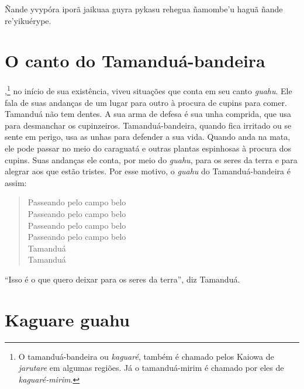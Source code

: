 Ñande yvypóra iporã jaikuaa guyra pykasu rehegua ñamombe'u haguã ñande
re'yikuérype.

\chapter{O canto do Tamanduá-bandeira}
,\footnote{O tamanduá-bandeira ou \textit{kaguaré}, também é chamado pelos Kaiowa de \textit{jarutare} em algumas regiões. Já o tamanduá-mirim é
  chamado por eles de \textit{kaguaré-mirim}.} no início de sua existência, viveu situações que conta em seu canto \textit{guahu}. Ele fala de suas andanças de um lugar para outro à procura de cupins para comer. Tamanduá não tem dentes. A sua arma de defesa é sua unha comprida, que usa para
desmanchar os cupinzeiros. Tamanduá-bandeira, quando fica irritado ou se
sente em perigo, usa as unhas para defender a sua vida. Quando anda na
mata, ele pode passar no meio do caraguatá e outras plantas espinhosas à
procura dos cupins. Suas andanças ele conta, por meio do \textit{guahu},
para os seres da terra e para alegrar aos que estão tristes. Por esse
motivo, o \textit{guahu} do Tamanduá-bandeira é assim:

\begin{verse}
Passeando\footnotemark{} pelo campo belo\\
Passeando pelo campo belo\\
Passeando pelo campo belo\\
Passeando pelo campo belo\\
Tamanduá\\
Tamanduá
\end{verse}

``Isso é o que quero deixar para os seres da terra'', diz Tamanduá.


\chapter{Kaguare guahu}

